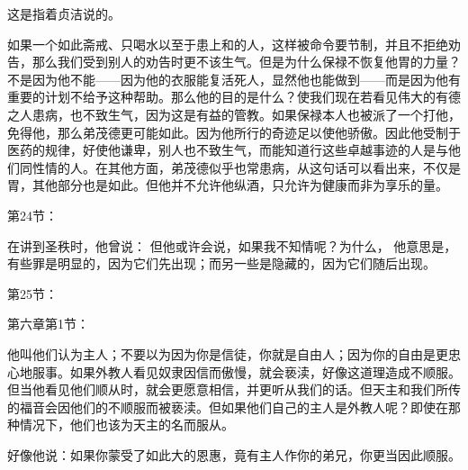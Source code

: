  这是指着贞洁说的。\par

 如果一个如此斋戒、只喝水以至于患上和的人，这样被命令要节制，并且不拒绝劝告，那么我们受到别人的劝告时更不该生气。但是为什么保禄不恢复他胃的力量？不是因为他不能——因为他的衣服能复活死人，显然他也能做到——而是因为他有重要的计划不给予这种帮助。那么他的目的是什么？使我们现在若看见伟大的有德之人患病，也不致生气，因为这是有益的管教。如果保禄本人也被派了一个打他，免得他，那么弟茂德更可能如此。因为他所行的奇迹足以使他骄傲。因此他受制于医药的规律，好使他谦卑，别人也不致生气，而能知道行这些卓越事迹的人是与他们同性情的人。在其他方面，弟茂德似乎也常患病，从这句话可以看出来，不仅是胃，其他部分也是如此。但他并不允许他纵酒，只允许为健康而非为享乐的量。\par

第24节：\par

在讲到圣秩时，他曾说： 但他或许会说，如果我不知情呢？为什么， 他意思是，有些罪是明显的，因为它们先出现；而另一些是隐藏的，因为它们随后出现。\par

第25节：\par

第六章第1节：\par

他叫他们认为主人；不要以为因为你是信徒，你就是自由人；因为你的自由是更忠心地服事。如果外教人看见奴隶因信而傲慢，就会亵渎，好像这道理造成不顺服。但当他看见他们顺从时，就会更愿意相信，并更听从我们的话。但天主和我们所传的福音会因他们的不顺服而被亵渎。但如果他们自己的主人是外教人呢？即使在那种情况下，他们也该为天主的名而服从。\par

 \par

好像他说：如果你蒙受了如此大的恩惠，竟有主人作你的弟兄，你更当因此顺服。\par

